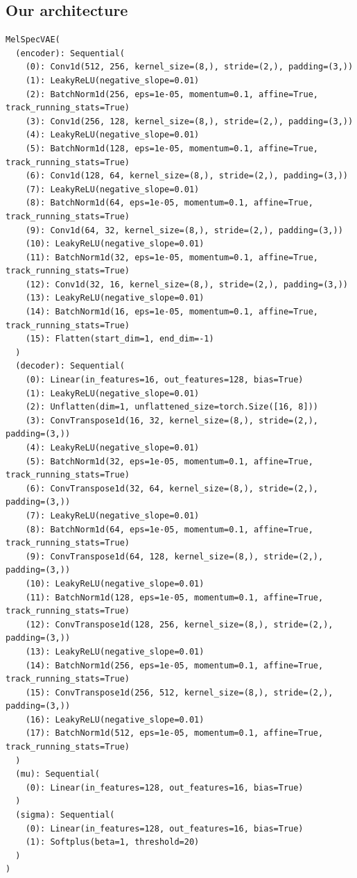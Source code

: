 \documentclass{article}
\begin{document}
\subsection{Our architecture}
\begin{lstlisting}
MelSpecVAE(
  (encoder): Sequential(
    (0): Conv1d(512, 256, kernel_size=(8,), stride=(2,), padding=(3,))
    (1): LeakyReLU(negative_slope=0.01)
    (2): BatchNorm1d(256, eps=1e-05, momentum=0.1, affine=True, track_running_stats=True)
    (3): Conv1d(256, 128, kernel_size=(8,), stride=(2,), padding=(3,))
    (4): LeakyReLU(negative_slope=0.01)
    (5): BatchNorm1d(128, eps=1e-05, momentum=0.1, affine=True, track_running_stats=True)
    (6): Conv1d(128, 64, kernel_size=(8,), stride=(2,), padding=(3,))
    (7): LeakyReLU(negative_slope=0.01)
    (8): BatchNorm1d(64, eps=1e-05, momentum=0.1, affine=True, track_running_stats=True)
    (9): Conv1d(64, 32, kernel_size=(8,), stride=(2,), padding=(3,))
    (10): LeakyReLU(negative_slope=0.01)
    (11): BatchNorm1d(32, eps=1e-05, momentum=0.1, affine=True, track_running_stats=True)
    (12): Conv1d(32, 16, kernel_size=(8,), stride=(2,), padding=(3,))
    (13): LeakyReLU(negative_slope=0.01)
    (14): BatchNorm1d(16, eps=1e-05, momentum=0.1, affine=True, track_running_stats=True)
    (15): Flatten(start_dim=1, end_dim=-1)
  )
  (decoder): Sequential(
    (0): Linear(in_features=16, out_features=128, bias=True)
    (1): LeakyReLU(negative_slope=0.01)
    (2): Unflatten(dim=1, unflattened_size=torch.Size([16, 8]))
    (3): ConvTranspose1d(16, 32, kernel_size=(8,), stride=(2,), padding=(3,))
    (4): LeakyReLU(negative_slope=0.01)
    (5): BatchNorm1d(32, eps=1e-05, momentum=0.1, affine=True, track_running_stats=True)
    (6): ConvTranspose1d(32, 64, kernel_size=(8,), stride=(2,), padding=(3,))
    (7): LeakyReLU(negative_slope=0.01)
    (8): BatchNorm1d(64, eps=1e-05, momentum=0.1, affine=True, track_running_stats=True)
    (9): ConvTranspose1d(64, 128, kernel_size=(8,), stride=(2,), padding=(3,))
    (10): LeakyReLU(negative_slope=0.01)
    (11): BatchNorm1d(128, eps=1e-05, momentum=0.1, affine=True, track_running_stats=True)
    (12): ConvTranspose1d(128, 256, kernel_size=(8,), stride=(2,), padding=(3,))
    (13): LeakyReLU(negative_slope=0.01)
    (14): BatchNorm1d(256, eps=1e-05, momentum=0.1, affine=True, track_running_stats=True)
    (15): ConvTranspose1d(256, 512, kernel_size=(8,), stride=(2,), padding=(3,))
    (16): LeakyReLU(negative_slope=0.01)
    (17): BatchNorm1d(512, eps=1e-05, momentum=0.1, affine=True, track_running_stats=True)
  )
  (mu): Sequential(
    (0): Linear(in_features=128, out_features=16, bias=True)
  )
  (sigma): Sequential(
    (0): Linear(in_features=128, out_features=16, bias=True)
    (1): Softplus(beta=1, threshold=20)
  )
)
\end{lstlisting}
\end{document}
